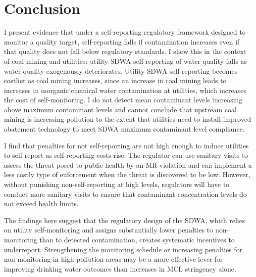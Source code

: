 \documentclass[12pt]{article}
\begin{document}
\section{Conclusion}

I present evidence that under a self-reporting regulatory framework designed to monitor a quality target, self-reporting falls if contamination increases even if that quality does not fall below regulatory standards. I show this in the context of coal mining and utilities: utility SDWA self-reporting of water quality falls as water quality exogenously deteriorates. Utility SDWA self-reporting becomes costlier as coal mining increases, since an increase in coal mining leads to increases in inorganic chemical water contamination at utilities, which increases the cost of self-monitoring. I do not detect mean contaminant levels increasing above maximum contaminant levels and cannot conclude that upstream coal mining is increasing pollution to the extent that utilities need to install improved abatement technology to meet SDWA maximum contaminant level compliance. 

I find that penalties for not self-reporting are not high enough to induce utilities to self-report as self-reporting costs rise. The regulator can use sanitary visits to assess the threat posed to public health by an MR violation and can implement a less costly type of enforcement when the threat is discovered to be low. However, without punishing non-self-reporting at high levels, regulators will have to conduct more sanitary visits to ensure that contaminant concentration levels do not exceed health limits.

The findings here suggest that the regulatory design of the SDWA, which relies on utility self-monitoring and assigns substantially lower penalties to non-monitoring than to detected contamination, creates systematic incentives to underreport. Strengthening the monitoring schedule or increasing penalties for non-monitoring in high-pollution areas may be a more effective lever for improving drinking water outcomes than increases in MCL stringency alone.

\newpage


\end{document}
